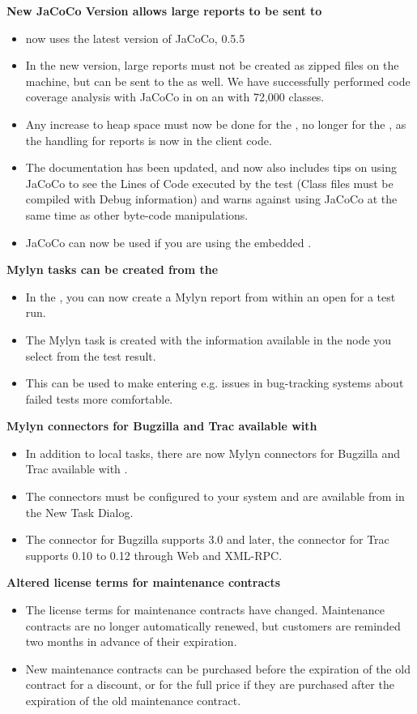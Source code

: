 \textbf{New JaCoCo Version allows large reports to be sent to \ite{}}
\begin{itemize}
\item \app{} now uses the latest version of JaCoCo, 0.5.5
\item In the new version, large reports must not be created as zipped files on the \gdagent{} machine, but can be sent to the \ite{} as well.  We have successfully performed code coverage analysis with JaCoCo in  \app{} on an \gdaut{} with 72,000 classes.  
\item Any increase to heap space must now be done for the \ite{}, no longer for the \gdagent{}, as the handling for reports is now in the client code. 
\item The documentation has been updated, and now also includes tips on using JaCoCo to see the Lines of Code executed by the test (Class files must be compiled with Debug information) and warns against using JaCoCo at the same time as other byte-code manipulations.
\item JaCoCo can now be used if you are using the embedded \gdagent{}. 
\end{itemize}

\textbf{Mylyn tasks can be created from the \reportpersp{}}
\begin{itemize}
\item In the \reportpersp{}, you can now create a Mylyn report from within an open \gdtestresultview{} for a test run. 
\item The Mylyn task is created with the information available in the node you select from the test result. 
\item This can be used to make entering e.g. issues in bug-tracking systems about failed tests more comfortable. 
\end{itemize}

\textbf{Mylyn connectors for Bugzilla and Trac available with \app{}}
\begin{itemize}
\item In addition to local tasks, there are now Mylyn connectors for Bugzilla and Trac available with \app{}.
\item The connectors must be configured to your system and are available from  in the New Task Dialog.
\item The connector for Bugzilla supports 3.0 and later, the connector for Trac supports 0.10 to 0.12 through Web and XML-RPC.
\end{itemize}


\textbf{Altered license terms for maintenance contracts}
\begin{itemize}
\item The license terms for maintenance contracts have changed. Maintenance contracts are no longer automatically renewed, but customers are reminded two months in advance of their expiration. 
\item New maintenance contracts can be purchased before the expiration of the old contract for a discount, or for the full price if they are purchased after the expiration of the old maintenance contract. 
\end{itemize}
